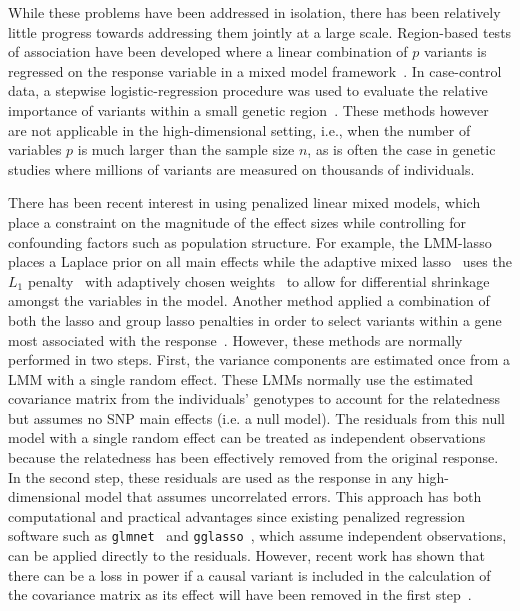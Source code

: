 \documentclass[12pt,letter]{article}\usepackage[]{graphicx}\usepackage[]{color}
\begin{document}
While these problems have been addressed in isolation, there has been relatively little progress towards addressing them jointly at a large scale.
Region-based tests of association have been developed where a linear combination of $p$ variants is regressed on the response variable in a mixed model framework~\citep{oualkacha2013adjusted}.
In case-control data, a stepwise logistic-regression procedure was used to evaluate the relative importance of variants within a small genetic region~\citep{cordell2002unified}.
These methods however are not applicable in the high-dimensional setting, i.e., when the number of variables $p$ is much larger than the sample size $n$, as is often the case in genetic studies where millions of variants are measured on thousands of individuals.

There has been recent interest in using penalized linear mixed models, which place a constraint on the magnitude of the effect sizes while controlling for confounding factors such as population structure.
For example, the LMM-lasso~\citep{rakitsch2013lasso} places a Laplace prior on all main effects while the adaptive mixed lasso~\citep{wang2011identifying} uses the $L_1$ penalty~\citep{tibshirani1996regression} with adaptively chosen weights~\citep{zou2006adaptive} to allow for differential shrinkage amongst the variables in the model.
Another method applied a combination of both the lasso and group lasso penalties in order to select variants within a gene most associated with the response~\citep{ding20142}.
However, these methods are normally performed in two steps. First, the variance components are estimated once from a LMM with a single random effect. These LMMs normally use the estimated covariance matrix from the individuals' genotypes to account for the relatedness but assumes no SNP main effects (i.e. a null model).
The residuals from this null model with a single random effect can be treated as independent observations because the relatedness has been effectively removed from the original response.
In the second step, these residuals are used as the response in any high-dimensional model that assumes uncorrelated errors.
This approach has both computational and practical advantages since existing penalized regression software such as \texttt{glmnet}~\citep{friedman2010regularization} and \texttt{gglasso}~\citep{yang2015fast}, which assume independent observations, can be applied directly to the residuals.
However, recent work has shown that there can be a loss in power if a causal variant is included in the calculation of the covariance matrix as its effect will have been removed in the first step~\citep{oualkacha2013adjusted,yang2014advantages}.
\end{document}
